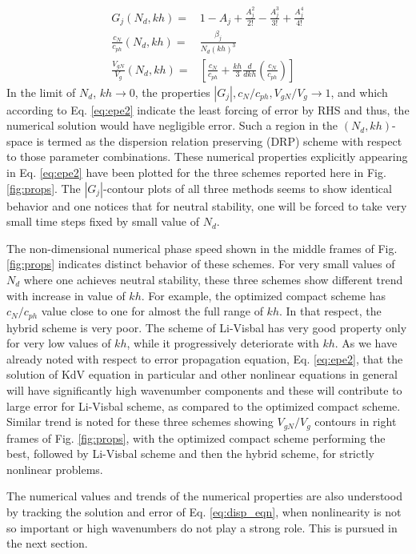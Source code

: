 \begin{align}
\label{eq:G}
G_j(N_d,kh) = & 1 - A_j + \frac{A_j^2}{2!} -\frac{A_j^3}{3!} + \frac{A_j^4}{4!} \\
\label{eq:cn_cph}
\frac{c_N}{c_{ph}}(N_d,kh) = & \frac{\beta_j}{N_d(kh)^3}\\
\label{eq:vg}
\frac{V_{gN}}{V_g}(N_d,kh) = & \left[\frac{c_N}{c_{ph}} + \frac{kh}{3} \frac{d}{dkh} \left( \frac{c_N}{c_{ph}} \right) \right]
\end{align}
In the limit of $N_d$, $kh \to 0$, the properties $|G_j|,c_N/c_{ph},V_{gN}/V_g \to 1$, and which according to Eq. \eqref{eq:epe2} indicate 
the least forcing of error by RHS and thus, the numerical solution would have negligible error. Such a region in the $(N_d, kh)$-space is termed 
as the dispersion relation preserving (DRP) scheme with respect to those parameter combinations. These numerical properties explicitly appearing 
in Eq. \eqref{eq:epe2} have been plotted for the three schemes reported here in Fig. \ref{fig:props}. The $|G_j|$-contour plots of all three methods 
seems to show identical behavior and one notices that for neutral stability, one will be forced to take very small time steps fixed by small value 
of $N_d$. 

The non-dimensional numerical phase speed shown in the middle frames of Fig. \ref{fig:props} indicates distinct behavior of these schemes. For
very small values of $N_d$ where one achieves neutral stability, these three schemes show different trend with increase in value of $kh$. For example, 
the optimized compact scheme has $c_N/c_{ph}$ value close to one for almost the full range of $kh$. In that respect, the hybrid scheme is very poor.
The scheme of Li-Visbal has very good property only for very low values of $kh$, while it progressively deteriorate with $kh$. As we have already 
noted with respect to error propagation equation, Eq. \eqref{eq:epe2}, that the solution of KdV equation in particular and other nonlinear equations
in general will have significantly high wavenumber components and these will contribute to large error for Li-Visbal scheme, as compared to the 
optimized compact scheme. Similar trend is noted for these three schemes showing $V_{gN}/V_g$ contours in right frames of Fig. \ref{fig:props}, 
with the optimized compact scheme performing the best, followed by Li-Visbal scheme and then the hybrid scheme, for strictly nonlinear problems.    

The numerical values and trends of the numerical properties are also understood by tracking the solution and error of Eq. \eqref{eq:disp_eqn}, when
nonlinearity is not so important or high wavenumbers do not play a strong role. This is pursued in the next section. 

